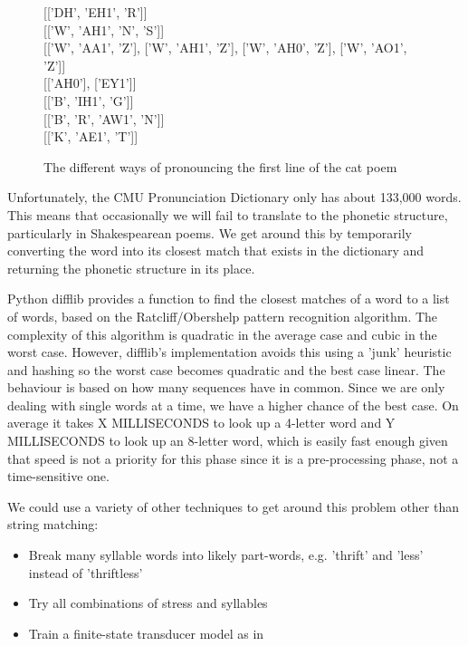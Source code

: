 \begin{figure}
\centering
{[{['DH', 'EH1', 'R']}]} \\
{[{['W', 'AH1', 'N', 'S']}]}\\
{[{['W', 'AA1', 'Z']}, {['W', 'AH1', 'Z']}, {['W', 'AH0', 'Z']}, {['W', 'AO1', 'Z']}]}\\
{[{['AH0']}, {['EY1']}]}\\
{[{['B', 'IH1', 'G']}]}\\
{[{['B', 'R', 'AW1', 'N']}]}\\
{[{['K', 'AE1', 'T']}]}
\caption{The different ways of pronouncing the first line of the cat poem}
\label{fig:catpronun}
\end{figure}

Unfortunately, the CMU Pronunciation Dictionary only has about 133,000 words. This means that occasionally we will fail to translate to the phonetic structure, particularly in Shakespearean poems. We get around this by temporarily converting the word into its closest match that exists in the dictionary and returning the phonetic structure in its place.

Python difflib provides a function to find the closest matches of a word to a list of words, based on the Ratcliff/Obershelp pattern recognition algorithm. The complexity of this algorithm is quadratic in the average case and cubic in the worst case. However, difflib's implementation avoids this using a 'junk' heuristic and hashing so the worst case becomes quadratic and the best case linear. The behaviour is based on  how many sequences have in common. Since we are only dealing with single words at a time, we have a higher chance of the best case. On average it takes X MILLISECONDS to look up a 4-letter word and Y MILLISECONDS to look up an 8-letter word, which is easily fast enough given that speed is not a priority for this phase since it is a pre-processing phase, not a time-sensitive one.

We could use a variety of other techniques to get around this problem other than string matching:
\begin{itemize}
\item{Break many syllable words into likely part-words, e.g. 'thrift' and 'less' instead of 'thriftless'}
\item{Try all combinations of stress and syllables}
\item{Train a finite-state transducer model as in \cite{dobrivsek2010towards}}
\end{itemize}

